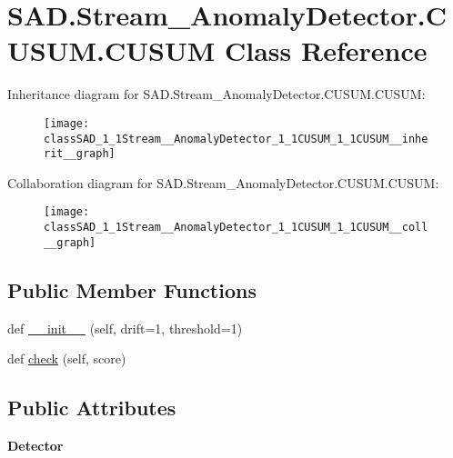\hypertarget{classSAD_1_1Stream__AnomalyDetector_1_1CUSUM_1_1CUSUM}{}\section{S\+A\+D.\+Stream\+\_\+\+Anomaly\+Detector.\+C\+U\+S\+U\+M.\+C\+U\+S\+UM Class Reference}
\label{classSAD_1_1Stream__AnomalyDetector_1_1CUSUM_1_1CUSUM}


Inheritance diagram for S\+A\+D.\+Stream\+\_\+\+Anomaly\+Detector.\+C\+U\+S\+U\+M.\+C\+U\+S\+UM\+:\nopagebreak
\begin{figure}[H]
\begin{center}
\leavevmode
\texttt{[image: classSAD\_1\_1Stream\_\_AnomalyDetector\_1\_1CUSUM\_1\_1CUSUM\_\_inherit\_\_graph]}
\end{center}
\end{figure}


Collaboration diagram for S\+A\+D.\+Stream\+\_\+\+Anomaly\+Detector.\+C\+U\+S\+U\+M.\+C\+U\+S\+UM\+:\nopagebreak
\begin{figure}[H]
\begin{center}
\leavevmode
\texttt{[image: classSAD\_1\_1Stream\_\_AnomalyDetector\_1\_1CUSUM\_1\_1CUSUM\_\_coll\_\_graph]}
\end{center}
\end{figure}
\subsection*{Public Member Functions}
\begin{DoxyCompactItemize}
\item 
def \hyperlink{classSAD_1_1Stream__AnomalyDetector_1_1CUSUM_1_1CUSUM_aea65fbf9e16b126dad9c1b91fe734a30}{\+\_\+\+\_\+init\+\_\+\+\_\+} (self, drift=1, threshold=1)
\item 
def \hyperlink{classSAD_1_1Stream__AnomalyDetector_1_1CUSUM_1_1CUSUM_a54cc2ba467941bf9413936ee882f456d}{check} (self, score)
\end{DoxyCompactItemize}
\subsection*{Public Attributes}
\begin{DoxyCompactItemize}
\item 
{\bfseries Detector}\hypertarget{classSAD_1_1Stream__AnomalyDetector_1_1CUSUM_1_1CUSUM_a323dd6bb57c96d09d2435fba0541503e}{}\label{classSAD_1_1Stream__AnomalyDetector_1_1CUSUM_1_1CUSUM_a323dd6bb57c96d09d2435fba0541503e}

\end{DoxyCompactItemize}


